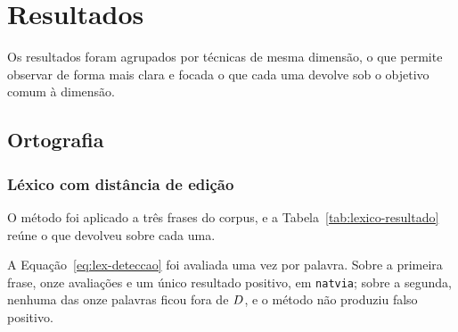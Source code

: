 %
% 
\section{Resultados}
\label{sec:resultados}

\indent\indent Os resultados foram agrupados por técnicas de mesma dimensão, 
o que permite observar de forma mais clara e focada o que cada uma devolve 
sob o objetivo comum à dimensão.


\subsection{Ortografia}
\label{res:ortografia}

\subsubsection{Léxico com distância de edição}
\label{res:lexico}

O método foi aplicado a três frases do corpus, e a Tabela~\ref{tab:lexico-resultado} reúne o
que devolveu sobre cada uma.

\begin{table}[H]
\centering
{}
\caption{Achados do léxico sobre três frases.}
\label{tab:lexico-resultado}
\end{table}

A Equação~\ref{eq:lex-deteccao} foi avaliada uma vez por palavra. Sobre a primeira frase, onze
avaliações e um único resultado positivo, em \texttt{natvia}; sobre a segunda, nenhuma das
onze palavras ficou fora de $D$, e o método não produziu falso positivo.

